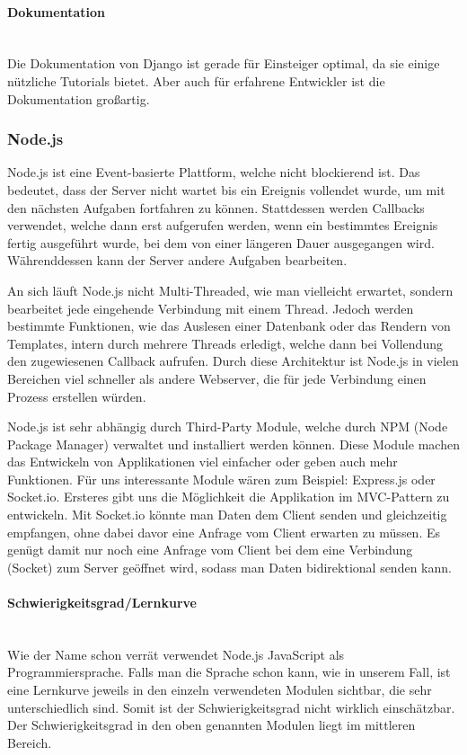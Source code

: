 \paragraph{Dokumentation} \mbox{}\\
Die Dokumentation von Django ist gerade f\"ur Einsteiger optimal, da sie einige n\"utzliche Tutorials bietet. Aber auch f\"ur erfahrene Entwickler ist die Dokumentation gro{\ss}artig. \cite{DjangoDoc}
\newpage

\subsubsection{Node.js}
Node.js ist eine Event-basierte Plattform, welche nicht blockierend ist. Das bedeutet, dass der Server nicht wartet bis ein Ereignis vollendet wurde, um mit den n\"achsten Aufgaben fortfahren zu k\"onnen. Stattdessen werden Callbacks verwendet, welche dann erst aufgerufen werden, wenn ein bestimmtes Ereignis fertig ausgef\"uhrt wurde, bei dem von einer l\"angeren Dauer ausgegangen wird. W\"ahrenddessen kann der Server andere Aufgaben bearbeiten.\cite{node_eval}

An sich l\"auft Node.js nicht Multi-Threaded, wie man vielleicht erwartet, sondern bearbeitet jede eingehende Verbindung mit einem Thread. Jedoch werden bestimmte Funktionen, wie das Auslesen einer Datenbank oder das Rendern von Templates, intern durch mehrere Threads erledigt, welche dann bei Vollendung den zugewiesenen Callback aufrufen. Durch diese Architektur ist Node.js in vielen Bereichen viel schneller als andere Webserver, die f\"ur jede Verbindung einen Prozess erstellen w\"urden.

Node.js ist sehr abh\"angig durch Third-Party Module, welche durch \gls{NPM} (Node Package Manager) verwaltet und installiert werden k\"onnen. Diese Module machen das Entwickeln von Applikationen viel einfacher oder geben auch mehr Funktionen. F\"ur uns interessante Module w\"aren zum Beispiel: Express.js oder Socket.io. Ersteres gibt uns die M\"oglichkeit die Applikation im \gls{MVC}-Pattern zu entwickeln.
Mit Socket.io k\"onnte man Daten dem Client senden und gleichzeitig empfangen, ohne dabei davor eine Anfrage vom Client erwarten zu m\"ussen. Es gen\"ugt damit nur noch eine Anfrage vom Client bei dem eine Verbindung (Socket) zum Server ge\"offnet wird, sodass man Daten bidirektional senden kann.

\paragraph{Schwierigkeitsgrad/Lernkurve} \mbox{}\\
Wie der Name schon verr\"at verwendet Node.js JavaScript als Programmiersprache. Falls man die Sprache schon kann, wie in unserem Fall, ist eine Lernkurve jeweils in den einzeln verwendeten Modulen sichtbar, die sehr unterschiedlich sind. Somit ist der Schwierigkeitsgrad nicht wirklich einsch\"atzbar. Der Schwierigkeitsgrad in den oben genannten Modulen liegt im mittleren Bereich.

